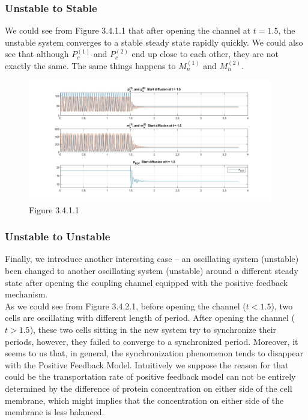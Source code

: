 \documentclass[12pt]{article}
\renewcommand{\(}{\left (}
\renewcommand{\)}{\right )}
\begin{document}
\subsubsection{Unstable to Stable}

\hspace{5mm} We could see from Figure 3.4.1.1 that after opening the channel at $t = 1.5$, the unstable system converges to a stable steady state rapidly quickly. We could also see that although $P_c^{(1)}$ and $P_c^{(2)}$ end up close to each other, they are not exactly the same. The same things happens to $M_n^{(1)}$ and $M_n^{(2)}$. \\

\newpage

\begin{figure}[h!]
    \centering
	\begin{minipage}{0.99\textwidth}
		\centering
		\includegraphics[width=0.95\textwidth]{PF_US.jpg}
		\caption*{\small Figure 3.4.1.1}
	\end{minipage}
\end{figure}

\subsubsection{Unstable to Unstable}

\hspace{5mm} Finally, we introduce another interesting case -- an oscillating system (unstable) been changed to another oscillating system (unstable) around a different steady state after opening the coupling channel equipped with the positive feedback mechanism. \\

As we could see from Figure 3.4.2.1, before opening the channel ($t < 1.5$), two cells are oscillating with different length of period. After opening the channel ($t > 1.5$), these two cells sitting in the new system try to synchronize their periods, however, they failed to converge to a synchronized period. Moreover, it seems to us that, in general, the synchronization phenomenon tends to disappear with the Positive Feedback Model. Intuitively we suppose the reason for that could be the transportation rate of positive feedback model can not be entirely determined by the difference of protein concentration on either side of the cell membrane, which might implies that the concentration on either side of the membrane is less balanced. \\
\end{document}
